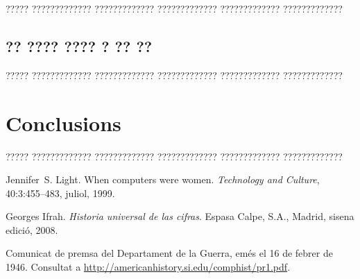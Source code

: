 \documentclass[11pt,spanish,listoffigures,listoftables]{tfgetsinf}
\begin{document}
????? ????????????? ????????????? ????????????? ????????????? ????????????? 

\section{?? ???? ???? ? ?? ??}

????? ????????????? ????????????? ????????????? ????????????? ?????????????


\chapter{Conclusions}

????? ????????????? ????????????? ????????????? ????????????? ????????????? 


\begin{thebibliography}{10}

   Jennifer~S. Light.
   \newblock When computers were women.
   \newblock \textit{Technology and Culture}, 40:3:455--483, juliol, 1999.

   Georges Ifrah.
   \newblock \textit{Historia universal de las cifras}.
   \newblock Espasa Calpe, S.A., Madrid, sisena edició, 2008.

   Comunicat de premsa del Departament de la Guerra, 
   emés el 16 de febrer de 1946. 
   \newblock Consultat a 
   \url{http://americanhistory.si.edu/comphist/pr1.pdf}.

\end{thebibliography}
\cleardoublepage
\end{document}

